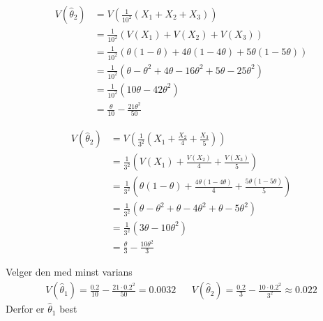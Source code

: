 \documentclass{article}
\begin{document}
\begin{figure}[Htb]
  \centering
\hspace{0cm}\begin{minipage}[t]{0.1\linewidth}
  \begin{align*}
    V(\hat{\theta}_2) &= V\left( \frac{1}{10^2}(X_1+X_2+X_3) \right)\\
                      &= \frac{1}{10^2}(V(X_1)+V(X_2)+V(X_3))\\
                      &= \frac{1}{10^2} (\theta(1-\theta)+4\theta(1-4\theta)+5\theta(1-5\theta))\\
                      &=\frac{1}{10^2}(\theta-\theta^2+4\theta-16\theta^2+5\theta-25\theta^2)\\
                      &= \frac{1}{10^2} (10\theta-42\theta^2)\\
                      &= \frac{\theta}{10}-\frac{21\theta^2}{50}
  \end{align*}
\end{minipage}
\begin{minipage}[t]{0.1\linewidth}
  \begin{align*}
    V(\hat{\theta}_2) &= V\left( \frac{1}{3^2} \left( X_1 + \frac{X_2}{4} + \frac{X_3}{5} \right) \right)\\
                      &= \frac{1}{3^2} \left(  V(X_1) + \frac{V(X_2)}{4} + \frac{V(X_3)}{5} \right)\\
                      &= \frac{1}{3^2} \left( \theta(1-\theta) + \frac{4\theta(1-4\theta)}{4} + \frac{5\theta(1-5\theta)}{5} \right)\\
                      &= \frac{1}{3^2} (\theta - \theta^2 + \theta - 4\theta^2+\theta-5\theta^2)\\
                      &= \frac{1}{3^2}(3\theta - 10\theta^2)\\
                      &= \frac{\theta}{3}-\frac{10\theta^2}{3}
  \end{align*}
\end{minipage}
\end{figure}

\newpage
Velger den med minst varians
\begin{align*}
  V(\hat{\theta}_1)=\frac{0.2}{10}-\frac{21\cdot 0.2^2}{50}=0.0032 && V(\hat{\theta}_2)=\frac{0.2}{3}-\frac{10\cdot 0.2^2}{3^2}\approx 0.022
\end{align*}
Derfor er $\hat{\theta}_1$ best\\
\end{document}
